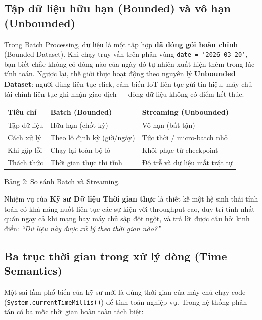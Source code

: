\documentclass[12pt]{article}
\begin{document}
\subsection{Tập dữ liệu hữu hạn (Bounded) và vô hạn (Unbounded)}

Trong Batch Processing, dữ liệu là một tập hợp \textbf{đã đóng gói hoàn chỉnh} (Bounded Dataset). Khi chạy truy vấn trên phân vùng \texttt{date = '2026-03-20'}, bạn biết chắc không có dòng nào của ngày đó tự nhiên xuất hiện thêm trong lúc tính toán. Ngược lại, thế giới thực hoạt động theo nguyên lý \textbf{Unbounded Dataset}: người dùng liên tục click, cảm biến IoT liên tục gửi tín hiệu, máy chủ tài chính liên tục ghi nhận giao dịch --- dòng dữ liệu không có điểm kết thúc.

\noindent
\begin{longtable}{@{}>{\RaggedRight\arraybackslash}p{3.4cm}>{\RaggedRight\arraybackslash}p{6.0cm}>{\RaggedRight\arraybackslash}p{6.2cm}@{}}
\rowcolor{rowLavender}
\textbf{Tiêu chí} & \textbf{Batch (Bounded)} & \textbf{Streaming (Unbounded)} \\
\addlinespace[3pt]
\endhead
Tập dữ liệu & Hữu hạn (chốt kỳ) & Vô hạn (bất tận) \\
\addlinespace[3pt]
Cách xử lý & Theo lô định kỳ (giờ/ngày) & Tức thời / micro-batch nhỏ \\
\addlinespace[3pt]
Khi gặp lỗi & Chạy lại toàn bộ lô & Khôi phục từ checkpoint \\
\addlinespace[3pt]
Thách thức & Thời gian thực thi tĩnh & Độ trễ và dữ liệu mất trật tự \\
\end{longtable}

\begin{captionbelowboxaivn}
Bảng 2: So sánh Batch và Streaming.
\end{captionbelowboxaivn}

Nhiệm vụ của \textbf{Kỹ sư Dữ liệu Thời gian thực} là thiết kế một hệ sinh thái tính toán có khả năng nuốt liên tục các sự kiện với throughput cao, duy trì tính nhất quán ngay cả khi mạng hay máy chủ sập đột ngột, và trả lời được câu hỏi kinh điển: \textit{``Dữ liệu này được xử lý theo thời gian nào?''}

\subsection{Ba trục thời gian trong xử lý dòng (Time Semantics)}

Một sai lầm phổ biến của kỹ sư mới là dùng thời gian của máy chủ chạy code (\texttt{System.currentTimeMillis()}) để tính toán nghiệp vụ. Trong hệ thống phân tán có ba mốc thời gian hoàn toàn tách biệt:
\end{document}

